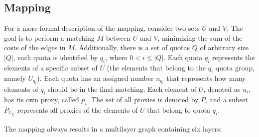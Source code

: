             \subsection{Mapping}
            
            For a more formal description of the mapping, consider two sets $U$ and $V$. The goal is to perform a matching $M$ between $U$ and $V$, minimizing the sum of the costs of the edges in $M$. Additionally, there is a set of quotas $Q$ of arbitrary size $|Q|$, each quota is identified by $q_i$, where $0 < i \leq |Q|$. Each quota $q_i$ represents the elements of a specific subset of $U$ (the elements that belong to the $q_i$ quota group, namely $U_{q_i}$). Each quota has an assigned number $n_{q_i}$ that represents how many elements of $q_i$ should be in the final matching. Each element of $U$, denoted as $u_i$, has its own proxy, called $p_{i}$. The set of all proxies is denoted by $P$, and a subset $P_{U_{q_i}}$ represents all proxies of the elements of $U$ that belong to quota $q_i$.
            
            The mapping always results in a multilayer graph containing six layers:
            
